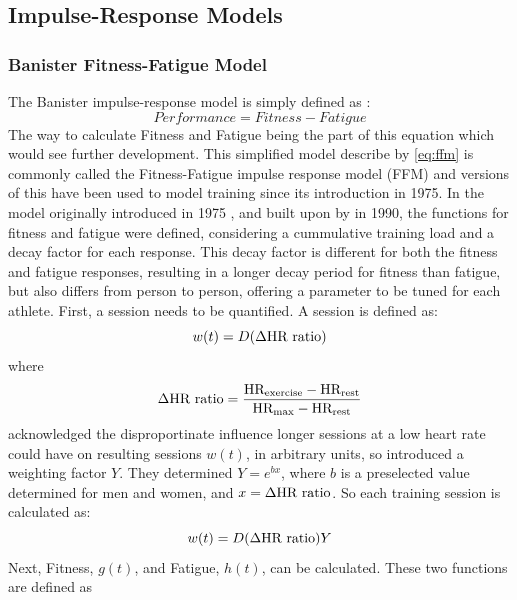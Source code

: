 \subsection{Impulse-Response Models} 
\subsubsection{Banister Fitness-Fatigue Model}
The Banister impulse-response model is simply defined as \cite{Churchill2014}:
\begin{equation}\label{eq:ffm}
  Performance = Fitness - Fatigue
\end{equation}
The way to calculate Fitness and Fatigue being the part of this equation which would see further development. This simplified model describe by \ref{eq:ffm} is commonly called the Fitness-Fatigue impulse response model (FFM) and versions of this have been used to model training since its introduction in 1975. In the model originally introduced in 1975 \cite{Bannister1976}, and built upon by \textcite{Morton1990} in 1990, the functions for fitness and fatigue were defined, considering a cummulative training load and a decay factor for each response. This decay factor is different for both the fitness and fatigue responses, resulting in a longer decay period for fitness than fatigue, but also differs from person to person, offering a parameter to be tuned for each athlete. First, a session needs to be quantified. A session is defined as:
\begin{equation}\label{eq:ban_imp_base}
  w(t) = D (\Delta \textnormal{HR ratio})
\end{equation}
where
\begin{equation*}
  \Delta \textnormal{HR ratio} = \frac{\textnormal{HR}_\textnormal{exercise} - \textnormal{HR}_\textnormal{rest}}{\textnormal{HR}_\textnormal{max} - \textnormal{HR}_\textnormal{rest}}
\end{equation*}
\textcite{Morton1990} acknowledged the disproportinate influence longer sessions at a low heart rate could have on resulting sessions $w(t)$, in arbitrary units, so introduced a weighting factor $Y$. They determined $Y = e^{bx}$, where $b$ is a preselected value determined for men and women, and $x = \Delta \textnormal{HR ratio}$. So each training session is calculated as:
\begin{equation}\label{eq:ban_impulse}
  w(t) = D (\Delta \textnormal{HR ratio})Y
\end{equation}
Next, Fitness, $g(t)$, and Fatigue, $h(t)$, can be calculated. These two functions are defined as
